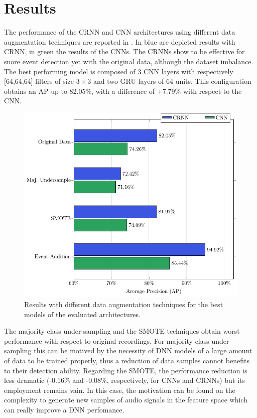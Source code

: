 \section{Results}
\label{sec:results}
The performance of the CRNN and CNN architectures using different data augmentation techniques are reported in . In blue are depicted results with CRNN, in green the results of the CNNs. The CRNNs show to be effective for snore event detection yet with the original data, although the dataset imbalance. The best performing model is composed of 3 CNN layers with respectively [64,64,64] filters of size $3\times3$ and two GRU layers of 64 units. This configuration obtains an AP up to 82.05\%, with a difference of +7.79\% with respect to the CNN.

\begin{figure}[t]
	\centering
	\includegraphics[width=0.7\columnwidth]{img/grafTex/results.pdf}
	\caption{Results with different data augmentation techniques for the best models of the evaluated architectures.} 
	\label{fig:results}
\end{figure}

The majority class under-sampling and the SMOTE techniques obtain worst performance with respect to original recordings. For majority class under sampling this can be motived by the necessity of DNN models of a large amount of data to be trained properly, thus a reduction of data samples cannot benefits to their detection ability. Regarding the SMOTE, the performance reduction is less dramatic (-0.16\% and -0.08\%, respectively, for CNNs and CRNNs) but its employment remains vain. In this case, the motivation can be found on the complexity to generate new samples of audio signals in the feature space which can really improve a DNN perfomance.

